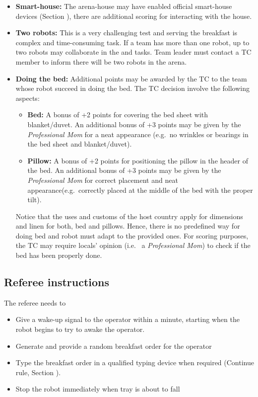 \begin{itemize}
	\item \textbf{Smart-house:} The arena-house may have enabled official smart-house devices (Section ), there are additional scoring for interacting with the house.

	\item \textbf{Two robots:} This is a very challenging test and serving the breakfast is complex and time-consuming task. If a team has more than one robot, up to two robots may collaborate in the  and  tasks. Team leader must contact a TC member to inform there will be two robots in the arena.

	\item \textbf{Doing the bed:} Additional points may be awarded by the TC to the team whose robot succeed in doing the bed. The TC decision involve the following aspects:
	\begin{itemize}
		\item \textbf{Bed:} A bonus of +2 points for covering the bed sheet with blanket/duvet. An additional bonus of +3 points may be given by the \textit{Professional Mom} for a neat appearance (e.g.~no wrinkles or bearings in the bed sheet and blanket/duvet).
		\item \textbf{Pillow:} A bonus of +2 points for positioning the pillow in the header of the bed. An additional bonus of +3 points may be given by the \textit{Professional Mom} for correct placement and neat appearance(e.g.~correctly placed at the middle of the bed with the proper tilt).
	\end{itemize}
	Notice that the uses and customs of the host country apply for dimensions and linen for both, bed and pillows. Hence, there is no predefined way for doing bed and robot must adapt to the provided ones. For scoring purposes, the TC may require locals' opinion (i.e.~ a \textit{Professional Mom}) to check if the bed has been properly done.
\end{itemize}

\subsection{Referee instructions}

The referee needs to
\begin{itemize}
	\item Give a wake-up signal to the operator within a minute, starting when the robot begins to try to awake the operator.
	\item Generate and provide a random breakfast order for the operator
	\item Type the breakfast order in a qualified typing device when required (Continue rule, Section ).
	\item Stop the robot immediately when tray is about to fall
\end{itemize}

